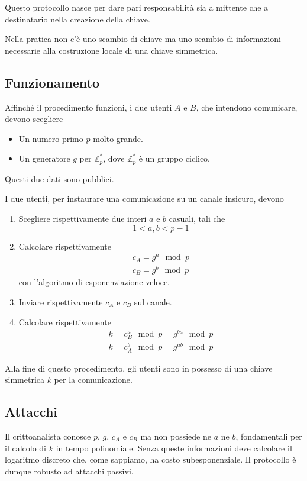 Questo protocollo nasce per dare pari responsabilit\`a sia a mittente che a destinatario nella creazione della
chiave.

Nella pratica non c'\`e uno scambio di chiave ma uno scambio di informazioni necessarie alla costruzione locale
di una chiave simmetrica.

\subsection{Funzionamento}
Affinch\'e il procedimento funzioni, i due utenti $A$ e $B$, che intendono comunicare, devono scegliere
\begin{itemize}
	\item Un numero primo $p$ molto grande.
	\item Un generatore $g$ per $\mathbb{Z}_p^*$, dove $\mathbb{Z}_p^*$ \`e un gruppo ciclico.
\end{itemize}
Questi due dati sono pubblici.

I due utenti, per instaurare una comunicazione su un canale insicuro, devono
\begin{enumerate}
	\item Scegliere rispettivamente due interi $a$ e $b$ casuali, tali che
	      \[ 1 < a, b < p-1 \]
	\item Calcolare rispettivamente
	      \begin{gather*}
		      c_A = g^a \mod{p} \\
		      c_B = g^b \mod{p}
	      \end{gather*}
	      con l'algoritmo di esponenziazione veloce.
	\item Inviare rispettivamente $c_A$ e $c_B$ sul canale.
	\item Calcolare rispettivamente
	      \begin{gather*}
		      k = c_B^a \mod{p} = g^{ba} \mod{p} \\
		      k = c_A^b \mod{p} = g^{ab} \mod{p}
	      \end{gather*}
\end{enumerate}
Alla fine di questo procedimento, gli utenti sono in possesso di una chiave simmetrica $k$ per la comunicazione.

\subsection{Attacchi}
Il crittoanalista conosce $p$, $g$, $c_A$ e $c_B$ ma non possiede ne $a$ ne $b$, fondamentali per il calcolo di $k$
in tempo polinomiale. Senza queste informazioni deve calcolare il logaritmo discreto che, come sappiamo, ha costo
subesponenziale. Il protocollo \`e dunque robusto ad attacchi passivi.

